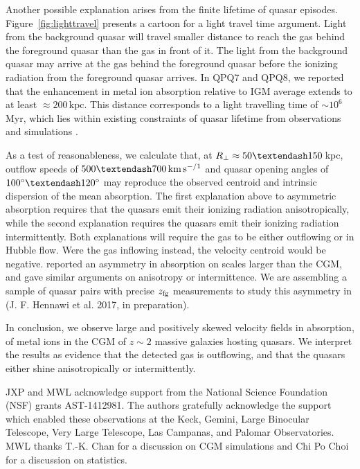 \documentclass[iop]{emulateapj}
\begin{document}
Another possible explanation arises from the finite lifetime of quasar episodes. 
Figure~\ref{fig:lighttravel} presents a cartoon for a light travel time argument. Light from the 
background quasar will travel smaller distance to reach the gas behind the foreground quasar 
than the gas in front of it. The light from the background quasar may arrive at the gas behind 
the foreground quasar before the ionizing radiation from the foreground quasar arrives. In 
QPQ7 and QPQ8, we reported that the enhancement in metal ion absorption relative to IGM average 
extends to at least $\approx200$\,kpc. This distance corresponds to a light travelling time of 
$\sim10^6$\,Myr, which lies within existing constraints of quasar lifetime from observations 
\citep[e.g.][]{Martini04} and simulations \citep[e.g.][]{Hopkins+05}. 

As a test of reasonableness, we calculate that, at $R_\perp\approx50\textendash150$\,kpc, 
outflow speeds of $500\textendash700\,{\rm km\,s^{-/1}}$ and quasar opening angles of 
$100^\circ\textendash120^\circ$ may reproduce the observed centroid and intrinsic dispersion of 
the  mean absorption. 
The first explanation above to asymmetric absorption requires that the quasars emit their ionizing 
radiation anisotropically, while the second explanation requires the quasars emit their ionizing 
radiation intermittently. Both explanations will require the gas to be either outflowing or in 
Hubble flow. Were the gas inflowing instead, the velocity centroid would be negative. 
\cite{KirkmanTytler08} reported an asymmetry in  absorption on scales larger than 
the CGM, and gave similar arguments on anisotropy or intermittence. We are assembling a sample of 
quasar pairs with precise 
$z_{\rm fg}$ measurements to study this asymmetry in  (J. F. Hennawi et al. 2017, in 
preparation). 

In conclusion, we observe large and positively skewed velocity fields in absorption, of metal ions 
in the CGM of $z\sim2$ massive galaxies hosting quasars. We interpret the results as evidence that 
the detected gas is outflowing, and that the quasars either shine anisotropically or 
intermittently. 

\acknowledgements

JXP and MWL acknowledge support from the National Science Foundation (NSF) grants AST-1412981. The 
authors gratefully acknowledge the support which enabled these observations at the Keck, Gemini, 
Large Binocular Telescope, Very Large Telescope, Las Campanas, and Palomar Observatories. MWL 
thanks T.-K. Chan for a discussion on CGM simulations and Chi Po Choi for a discussion on 
statistics. 



\end{document}
